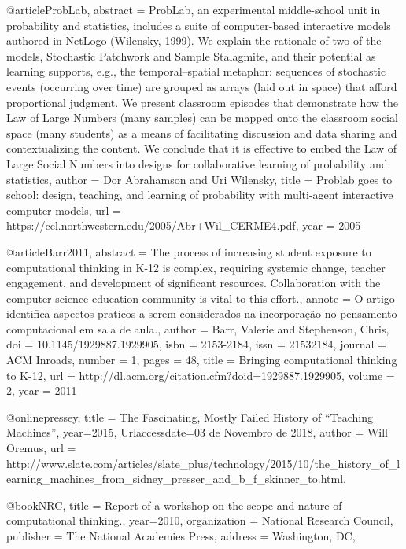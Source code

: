 @article{ProbLab,
abstract = {ProbLab, an experimental middle-school unit in probability and statistics, includes a
suite of computer-based interactive models authored in NetLogo (Wilensky, 1999). We
explain the rationale of two of the models, Stochastic Patchwork and Sample Stalagmite,
and their potential as learning supports, e.g., the temporal–spatial metaphor: sequences
of stochastic events (occurring over time) are grouped as arrays (laid out in space) that
afford proportional judgment. We present classroom episodes that demonstrate how the
Law of Large Numbers (many samples) can be mapped onto the classroom social space
(many students) as a means of facilitating discussion and data sharing and
contextualizing the content. We conclude that it is effective to embed the Law of Large
Social Numbers into designs for collaborative learning of probability and statistics},
author = {Dor Abrahamson and Uri Wilensky},
title = {{ Problab goes to school: design, teaching, and
learning of probability with multi-agent
interactive computer models}},
url = {https://ccl.northwestern.edu/2005/Abr+Wil_CERME4.pdf},
year = {2005}
}

@article{Barr2011,
abstract = {The process of increasing student exposure to computational thinking in K-12 is complex, requiring systemic change, teacher engagement, and development of significant resources. Collaboration with the computer science education community is vital to this effort.},
annote = {O artigo identifica aspectos praticos a serem considerados na incorpora{\c{c}}{\~{a}}o no pensamento computacional em sala de aula.},
author = {Barr, Valerie and Stephenson, Chris},
doi = {10.1145/1929887.1929905},
isbn = {2153-2184},
issn = {21532184},
journal = {ACM Inroads},
number = {1},
pages = {48},
title = {{Bringing computational thinking to K-12}},
url = {http://dl.acm.org/citation.cfm?doid=1929887.1929905},
volume = {2},
year = {2011}
}

@online{pressey,
	title = {The Fascinating, Mostly Failed History of “Teaching Machines”},
	year={2015},
	Urlaccessdate={03 de Novembro de 2018},
	author = {Will Oremus},
	url = {http://www.slate.com/articles/slate_plus/technology/2015/10/the_history_of_learning_machines_from_sidney_presser_and_b_f_skinner_to.html},
}

@book{NRC,
	title = {Report of a workshop on the scope and nature of computational thinking.},
	year={2010},
	organization = {National Research Council},
	publisher = {The National Academies Press},
	address = {Washington, DC},
}


